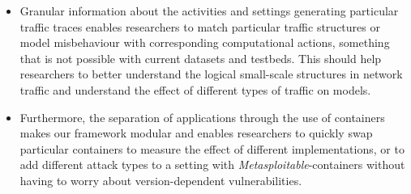 \documentclass{article}
\begin{document}
\begin{itemize}
\begin{itemize}
\item Granular information about the activities and settings generating particular traffic traces enables researchers to match particular traffic structures or model misbehaviour with corresponding computational actions, something that is not possible with current datasets and testbeds. This should help researchers to
better understand the logical small-scale structures in network traffic and understand the effect of different types of traffic on models. 

\item Furthermore, the separation of applications through the use of containers makes our framework modular and enables researchers to quickly swap particular containers to measure the effect of different implementations, or to add different attack types to a setting with \textit{Metasploitable}-containers without having to worry about version-dependent vulnerabilities.
\end{itemize}
\end{itemize}
\end{document}
